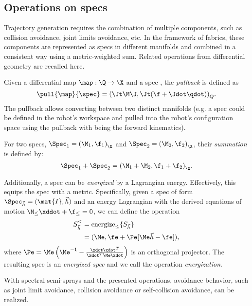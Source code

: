 \subsection{Operations on specs}%
\label{sub:operations_on_specs}
%
Trajectory generation requires the combination of multiple
components, such as collision avoidance, joint limits
avoidance, etc.
In the framework of \ac{fabrics}, these components are
represented as specs in different manifolds and combined in a consistent way using
a metric-weighted sum.
Related operations from differential geometry are recalled
here.

Given a differential map $\map: \Q\rightarrow\X$ and a spec \spec{}, the \textit{pullback}
is defined as 
\begin{equation}
  \pull{\map}{\spec} = {\left(\Jt\M\J, \Jt(\f+\Jdot\qdot)\right)}_{Q}.
  \label{eq:pullback}
\end{equation}
The pullback allows converting between two distinct manifolds (e.g. a spec could be 
defined in the robot's workspace and pulled into the robot's configuration space using
the pullback with \map{} being the forward kinematics).

For two specs, $\Spec_1 = {\left(\M_1,\f_1\right)}_{\X}$ and 
$\Spec_2 = {\left(\M_2,\f_2\right)}_{\X}$, their \textit{summation} is defined by:
\begin{equation}
  \Spec_1 + \Spec_2 = {\left(\M_1 + \M_2, \f_1 + \f_2\right)}_{\X}.
  \label{eq:specs_summation}
\end{equation}
%

Additionally, a spec can be \textit{energized} by a Lagrangian energy. Effectively, 
this equips the spec with a metric.
Specifically, given a spec of form $\Spec_{\vec{h}} = (\mat{I},\vec{h})$ and 
an energy Lagrangian \le{} with the derived equations of motion $\M_{\le}\xddot + \f_{\le} =0$, 
we can define the operation
\begin{equation}
  \begin{split}
  S_{\vec{h}}^{\le} &= \text{energize}_{\le}\{S_{\vec{h}}\} \\
    &= (\Me, \fe + \Pe[\Me\vec{h} - \fe]), 
  \end{split}
  \label{eq:energization}
\end{equation}
where $\Pe = \Me\left(\Me^{-1} - \frac{\xdot\xdot^T}{\xdot^T\Me\xdot}\right)$ is an
orthogonal projector. The resulting spec is an \textit{energized spec} and 
we call the operation \textit{energization}.

With spectral semi-sprays and the presented operations,
avoidance behavior, such as joint limit avoidance, collision
avoidance or self-collision avoidance, can be realized.

